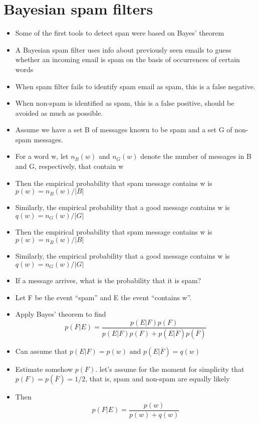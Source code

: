 \documentclass{article}[18pt]
\begin{document}
\section{Bayesian spam filters}
\begin{itemize}
	\item Some of the first tools to detect span were based on Bayes' theorem
	\item A Bayesian spam filter uses info about previously seen emails to guess
	whether an incoming email is spam on the basis of occurrences of certain
	words
	\item When spam filter fails to identify spam email as spam, this is a false negative.
	\item When non-spam is identified as spam, this is a false positive, should be
	avoided as much as possible.
	\item Assume we have a set B of messages known to be spam and a set G of
	non-spam messages.
	\item For a word w, let $n_B (w)$ and $n_G (w)$ denote the number of messages in B
	and G, respectively, that contain w
	\item Then the empirical probability that spam message contains w is $p ( w ) = n _ { B } ( w ) / | B |$
	\item  Similarly, the empirical probability that a good message contains w is $q ( w ) = n _ { G } ( w ) / | G |$
	\item Then the empirical probability that spam message contains w is $p ( w ) = n _ { B } ( w ) / | B |$
	\item Similarly, the empirical probability that a good message contains w is $q ( w ) = n _ { G } ( w ) / | G |$
	\item If a message arrives, what is the probability that it is spam?
	\item Let F be the event “spam” and E the event “contains w”.
	\item Apply Bayes' theorem to find
	$$p ( F | E ) = \frac { p ( E | F ) p ( F ) } { p ( E | F ) p ( F ) + p ( E | \overline { F } ) p ( \overline { F } ) }$$
	\item Can assume that $p ( E | F ) = p ( w ) \text { and } p ( E | \overline { F } ) = q ( w )$
	\item Estimate somehow $p(F)$. let's assume for the moment for simplicity that $p ( F ) = p ( \overline { F } ) = 1 / 2$, that is, spam and non-spam are equally likely
	\item Then
	$$p ( F | E ) = \frac { p ( w ) } { p ( w ) + q ( w ) }$$	
\end{itemize}
\end{document}
